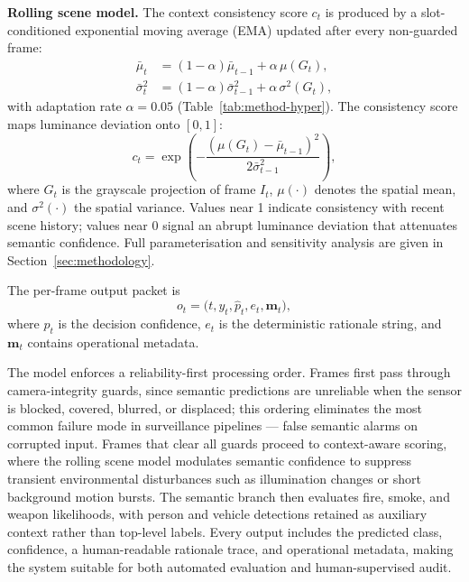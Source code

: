 \documentclass[a4paper,fleqn]{cas-dc}
\begin{document}
\textbf{Rolling scene model.}
The context consistency score $c_t$ is produced by a slot-conditioned exponential moving average (EMA) updated after every non-guarded frame:
\begin{equation}
\label{eq:scene-ema-model}
\begin{aligned}
\bar{\mu}_t &= (1-\alpha)\bar{\mu}_{t-1} + \alpha\,\mu(G_t), \\
\bar{\sigma}_t^2 &= (1-\alpha)\bar{\sigma}_{t-1}^2 + \alpha\,\sigma^2(G_t),
\end{aligned}
\end{equation}
with adaptation rate $\alpha = 0.05$ (Table~\ref{tab:method-hyper}). The consistency score maps luminance deviation onto $[0,1]$:
\begin{equation}
\label{eq:ct-model}
c_t = \exp\!\left(-\frac{(\mu(G_t)-\bar{\mu}_{t-1})^2}{2\bar{\sigma}_{t-1}^2}\right),
\end{equation}
where $G_t$ is the grayscale projection of frame $I_t$, $\mu(\cdot)$ denotes the spatial mean, and $\sigma^2(\cdot)$ the spatial variance. Values near 1 indicate consistency with recent scene history; values near 0 signal an abrupt luminance deviation that attenuates semantic confidence. Full parameterisation and sensitivity analysis are given in Section~\ref{sec:methodology}.
 
The per-frame output packet is
\begin{equation}
o_t=\bigl(t,y_t,\hat{p}_t,e_t,\mathbf{m}_t\bigr),
\end{equation}
where $\hat{p}_t$ is the decision confidence, $e_t$ is the deterministic rationale string, and $\mathbf{m}_t$ contains operational metadata.
 
The model enforces a reliability-first processing order. Frames first pass through camera-integrity guards, since semantic predictions are unreliable when the sensor is blocked, covered, blurred, or displaced; this ordering eliminates the most common failure mode in surveillance pipelines — false semantic alarms on corrupted input. Frames that clear all guards proceed to context-aware scoring, where the rolling scene model modulates semantic confidence to suppress transient environmental disturbances such as illumination changes or short background motion bursts. The semantic branch then evaluates fire, smoke, and weapon likelihoods, with person and vehicle detections retained as auxiliary context rather than top-level labels. Every output includes the predicted class, confidence, a human-readable rationale trace, and operational metadata, making the system suitable for both automated evaluation and human-supervised audit.
 
\end{document}
